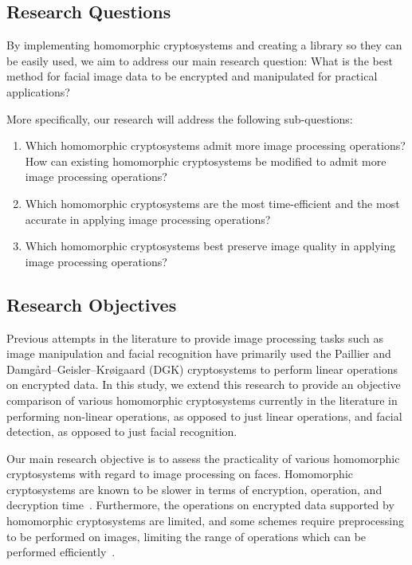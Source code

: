 \subsection{Research Questions}
By implementing homomorphic cryptosystems and creating a library so they can be easily used, we aim to address our main research question: What is the best method for facial image data to be encrypted and manipulated for practical applications?

More specifically, our research will address the following sub-questions:
\begin{enumerate}
	\item Which homomorphic cryptosystems admit more image processing operations? How can existing homomorphic cryptosystems be modified to admit more image processing operations?
	\item Which homomorphic cryptosystems are the most time-efficient and the most accurate in applying image processing operations?
	\item Which homomorphic cryptosystems best preserve image quality in applying image processing operations?
\end{enumerate}


\subsection{Research Objectives}
Previous attempts in the literature to provide image processing tasks such as image manipulation \cite{ziad_cryptoimg:_2016} and  facial recognition \cite{hutchison_privacy-preserving_2009} have primarily used the Paillier and  Damg{\aa}rd--Geisler--Kr{\o}igaard (DGK) cryptosystems to perform linear operations on encrypted data. In this study, we extend this research to provide an objective comparison of various homomorphic cryptosystems currently in the literature in performing non-linear operations, as opposed to just linear operations, and facial detection, as opposed to just facial recognition.

Our main research objective is to assess the practicality of various homomorphic cryptosystems with regard to image processing on faces. Homomorphic cryptosystems are known to be slower in terms of encryption, operation, and decryption time~\cite{sen_homomorphic_2013}. Furthermore, the operations on encrypted data supported by homomorphic cryptosystems are limited, and some schemes require preprocessing to be performed on images, limiting the range of operations which can be performed efficiently~\cite{li_elliptic_2012}.

